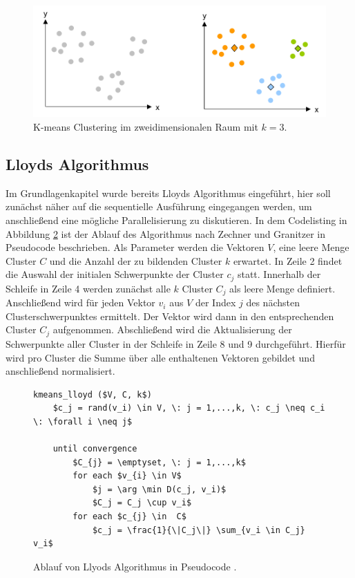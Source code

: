 \begin{figure}
	\centering
	\includegraphics[scale=0.55]{images/kmeans.png}
	\caption{K-means Clustering im zweidimensionalen Raum mit $k = 3$.}
	\label{img:kmeans}
\end{figure}

\subsection{Lloyds Algorithmus}

Im Grundlagenkapitel wurde bereits Lloyds Algorithmus eingeführt, hier soll zunächst näher auf die sequentielle Ausführung eingegangen werden, um anschließend eine mögliche Parallelisierung zu diskutieren. In dem Codelisting in Abbildung \ref{code:lloyd} ist der Ablauf des Algorithmus nach Zechner und Granitzer \cite{akc2009} in Pseudocode beschrieben. Als Parameter werden die Vektoren $V$, eine leere Menge Cluster $C$ und die Anzahl der zu bildenden Cluster $k$ erwartet. In Zeile 2 findet die Auswahl der initialen Schwerpunkte der Cluster $c_j$ statt. Innerhalb der Schleife in Zeile 4 werden zunächst alle $k$ Cluster $C_j$ als leere Menge definiert. Anschließend wird für jeden Vektor $v_i$ aus $V$ der Index $j$ des nächsten Clusterschwerpunktes ermittelt. Der Vektor wird dann in den entsprechenden Cluster $C_j$ aufgenommen. Abschließend wird die Aktualisierung der Schwerpunkte aller Cluster in der Schleife in Zeile 8 und 9 durchgeführt. Hierfür wird pro Cluster die Summe über alle enthaltenen Vektoren gebildet und anschließend normalisiert.

\begin{figure}
\lstset{language=C}
\begin{lstlisting}[mathescape=true]
kmeans_lloyd ($V, C, k$)
	$c_j = rand(v_i) \in V, \: j = 1,...,k, \: c_j \neq c_i \: \forall i \neq j$
	
	until convergence
		$C_{j} = \emptyset, \: j = 1,...,k$
		for each $v_{i} \in V$
			$j = \arg \min D(c_j, v_i)$	
			$C_j = C_j \cup v_i$	
		for each $c_{j} \in  C$
			$c_j = \frac{1}{\|C_j\|} \sum_{v_i \in C_j} v_i$
\end{lstlisting}
\caption{Ablauf von Llyods Algorithmus in Pseudocode \cite{akc2009}.}
\label{code:lloyd}
\end{figure}

